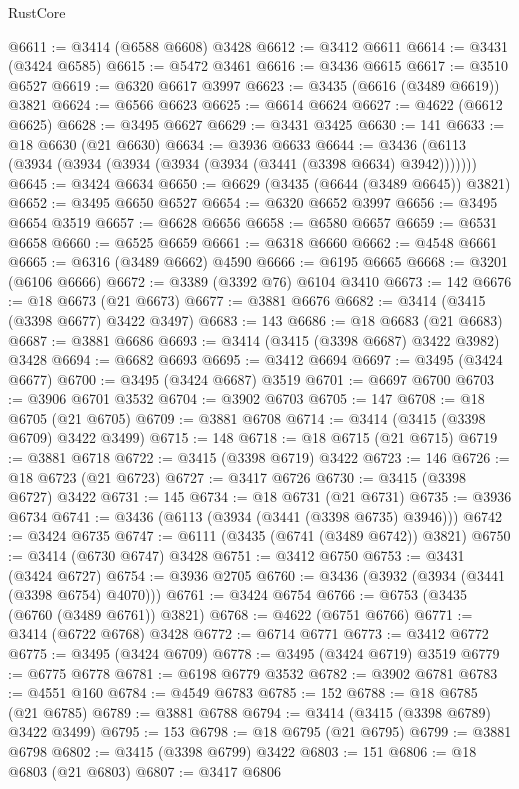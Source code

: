 \begin{lexlean}{RustCore}
\begin{coremodule}
@6611 := @3414 (@6588 @6608) @3428
@6612 := @3412 @6611
@6614 := @3431 (@3424 @6585)
@6615 := @5472 @3461
@6616 := @3436 @6615
@6617 := @3510 @6527
@6619 := @6320 @6617 @3997
@6623 := @3435 (@6616 (@3489 @6619)) @3821
@6624 := @6566 @6623
@6625 := @6614 @6624
@6627 := @4622 (@6612 @6625)
@6628 := @3495 @6627
@6629 := @3431 @3425
@6630 := 141
@6633 := @18 @6630 (@21 @6630)
@6634 := @3936 @6633
@6644 := @3436 (@6113 (@3934 (@3934 (@3934 (@3934 (@3934 (@3441 (@3398 @6634) @3942)))))))
@6645 := @3424 @6634
@6650 := @6629 (@3435 (@6644 (@3489 @6645)) @3821)
@6652 := @3495 @6650 @6527
@6654 := @6320 @6652 @3997
@6656 := @3495 @6654 @3519
@6657 := @6628 @6656
@6658 := @6580 @6657
@6659 := @6531 @6658
@6660 := @6525 @6659
@6661 := @6318 @6660
@6662 := @4548 @6661
@6665 := @6316 (@3489 @6662) @4590
@6666 := @6195 @6665
@6668 := @3201 (@6106 @6666)
@6672 := @3389 (@3392 @76) @6104 @3410
@6673 := 142
@6676 := @18 @6673 (@21 @6673)
@6677 := @3881 @6676
@6682 := @3414 (@3415 (@3398 @6677) @3422 @3497)
@6683 := 143
@6686 := @18 @6683 (@21 @6683)
@6687 := @3881 @6686
@6693 := @3414 (@3415 (@3398 @6687) @3422 @3982) @3428
@6694 := @6682 @6693
@6695 := @3412 @6694
@6697 := @3495 (@3424 @6677)
@6700 := @3495 (@3424 @6687) @3519
@6701 := @6697 @6700
@6703 := @3906 @6701 @3532
@6704 := @3902 @6703
@6705 := 147
@6708 := @18 @6705 (@21 @6705)
@6709 := @3881 @6708
@6714 := @3414 (@3415 (@3398 @6709) @3422 @3499)
@6715 := 148
@6718 := @18 @6715 (@21 @6715)
@6719 := @3881 @6718
@6722 := @3415 (@3398 @6719) @3422
@6723 := 146
@6726 := @18 @6723 (@21 @6723)
@6727 := @3417 @6726
@6730 := @3415 (@3398 @6727) @3422
@6731 := 145
@6734 := @18 @6731 (@21 @6731)
@6735 := @3936 @6734
@6741 := @3436 (@6113 (@3934 (@3441 (@3398 @6735) @3946)))
@6742 := @3424 @6735
@6747 := @6111 (@3435 (@6741 (@3489 @6742)) @3821)
@6750 := @3414 (@6730 @6747) @3428
@6751 := @3412 @6750
@6753 := @3431 (@3424 @6727)
@6754 := @3936 @2705
@6760 := @3436 (@3932 (@3934 (@3441 (@3398 @6754) @4070)))
@6761 := @3424 @6754
@6766 := @6753 (@3435 (@6760 (@3489 @6761)) @3821)
@6768 := @4622 (@6751 @6766)
@6771 := @3414 (@6722 @6768) @3428
@6772 := @6714 @6771
@6773 := @3412 @6772
@6775 := @3495 (@3424 @6709)
@6778 := @3495 (@3424 @6719) @3519
@6779 := @6775 @6778
@6781 := @6198 @6779 @3532
@6782 := @3902 @6781
@6783 := @4551 @160
@6784 := @4549 @6783
@6785 := 152
@6788 := @18 @6785 (@21 @6785)
@6789 := @3881 @6788
@6794 := @3414 (@3415 (@3398 @6789) @3422 @3499)
@6795 := 153
@6798 := @18 @6795 (@21 @6795)
@6799 := @3881 @6798
@6802 := @3415 (@3398 @6799) @3422
@6803 := 151
@6806 := @18 @6803 (@21 @6803)
@6807 := @3417 @6806

\end{coremodule}
\end{lexlean}
